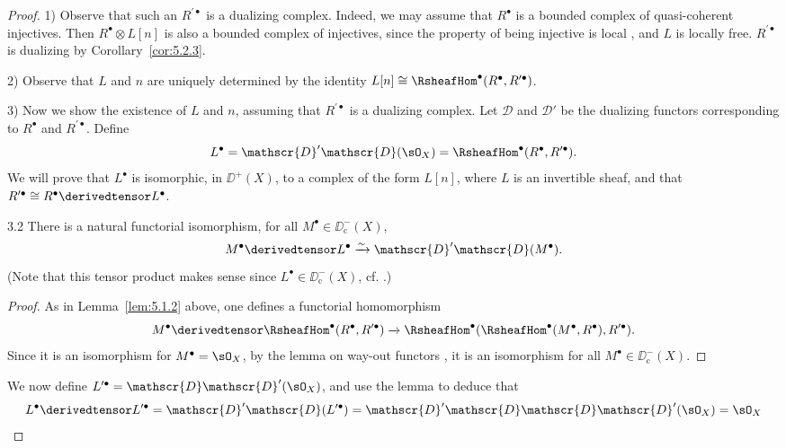 \begin{proof}
1) Observe that such an $R^{\prime\bullet}$ is a dualizing complex. Indeed, we may assume that $R^\bullet$ is a bounded complex of quasi-coherent injectives. Then $R^\bullet\otimes L[n]$ is also a bounded complex of injectives, since the property of being injective is local , and $L$ is locally free. $R^{\prime\bullet}$ is dualizing by Corollary~\ref{cor:5.2.3}.

2) Observe that $L$ and $n$ are uniquely determined by the identity $L[n]\cong \RsheafHom^\bullet(R^\bullet,R^{\prime\bullet})$.

3) Now we show the existence of $L$ and $n$, assuming that $R^{\prime\bullet}$ is a dualizing complex. Let $\mathscr{D}$ and $\mathscr{D}'$ be the dualizing functors corresponding to $R^\bullet$ and $R^{\prime\bullet}$. Define
\[
L^\bullet = \mathscr{D}'\mathscr{D}(\sO_X) = \RsheafHom^\bullet(R^\bullet,R^{\prime\bullet}).
\]
We will prove that $L^\bullet$ is isomorphic, in $\DD^+(X)$, to a complex of the form $L[n]$, where $L$ is an invertible sheaf, and that $R^{\prime\bullet}\cong R^{\bullet}\derivedtensor L^{\bullet}$.

\begin{booklemma}{3.2}\label{lem:5.3.2}
There is a natural functorial isomorphism, for all $M^{\bullet}\in\DD_{\mathrm{c}}^{-}(X)$,
\[
M^{\bullet}\derivedtensor L^{\bullet}\xrightarrow{\sim} \mathscr{D}'\mathscr{D}(M^{\bullet}).
\]
(Note that this tensor product makes sense since $L^\bullet\in\DD^-_{\mathrm{c}}(X)$, cf. .)
\end{booklemma}

\begin{proof}
As in Lemma~\ref{lem:5.1.2} above, one defines a functorial homomorphism
\[
M^{\bullet}\derivedtensor \RsheafHom^{\bullet}(R^{\bullet},R^{\prime\bullet})\xrightarrow{} \RsheafHom^{\bullet}(\RsheafHom^{\bullet}(M^{\bullet},R^{\bullet}),R^{\prime\bullet}).
\]
Since it is an isomorphism for $M^{\bullet}=\sO_X$, by the lemma on way-out functors , it is an isomorphism for all $M^{\bullet}\in\DD_{\mathrm{c}}^{-}(X)$.
\end{proof}

We now define $L^{\prime\bullet} = \mathscr{D}\mathscr{D}'(\sO_X)$, and use the lemma to deduce that
\[
L^\bullet \derivedtensor L^{\prime\bullet} = \mathscr{D}'\mathscr{D}(L^{\prime\bullet}) = \mathscr{D}'\mathscr{D}\mathscr{D}\mathscr{D}'(\sO_X) = \sO_X
\]



\end{proof}
